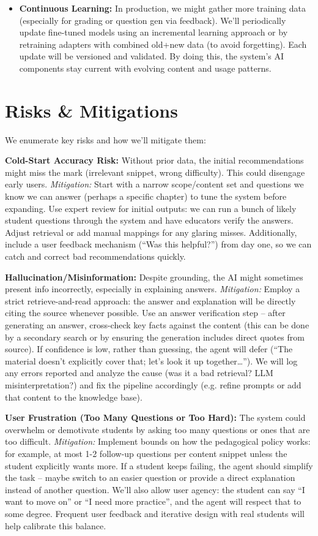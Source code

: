 \documentclass[11pt]{article}
\begin{document}
\begin{itemize}
  \item \textbf{Continuous Learning:} In production, we might gather more training data (especially for grading or question gen via feedback). We’ll periodically update fine-tuned models using an incremental learning approach or by retraining adapters with combined old+new data (to avoid forgetting). Each update will be versioned and validated. By doing this, the system’s AI components stay current with evolving content and usage patterns.
\end{itemize}

\section{Risks \& Mitigations}
We enumerate key risks and how we’ll mitigate them:

\textbf{Cold-Start Accuracy Risk:} Without prior data, the initial recommendations might miss the mark (irrelevant snippet, wrong difficulty). This could disengage early users. \textit{Mitigation:} Start with a narrow scope/content set and questions we know we can answer (perhaps a specific chapter) to tune the system before expanding. Use expert review for initial outputs: we can run a bunch of likely student questions through the system and have educators verify the answers. Adjust retrieval or add manual mappings for any glaring misses. Additionally, include a user feedback mechanism (“Was this helpful?”) from day one, so we can catch and correct bad recommendations quickly.

\textbf{Hallucination/Misinformation:} Despite grounding, the AI might sometimes present info incorrectly, especially in explaining answers. \textit{Mitigation:} Employ a strict retrieve-and-read approach: the answer and explanation will be directly citing the source whenever possible. Use an answer verification step – after generating an answer, cross-check key facts against the content (this can be done by a secondary search or by ensuring the generation includes direct quotes from source). If confidence is low, rather than guessing, the agent will defer (“The material doesn’t explicitly cover that; let’s look it up together…”). We will log any errors reported and analyze the cause (was it a bad retrieval? LLM misinterpretation?) and fix the pipeline accordingly (e.g. refine prompts or add that content to the knowledge base).

\textbf{User Frustration (Too Many Questions or Too Hard):} The system could overwhelm or demotivate students by asking too many questions or ones that are too difficult. \textit{Mitigation:} Implement bounds on how the pedagogical policy works: for example, at most 1-2 follow-up questions per content snippet unless the student explicitly wants more. If a student keeps failing, the agent should simplify the task – maybe switch to an easier question or provide a direct explanation instead of another question. We’ll also allow user agency: the student can say “I want to move on” or “I need more practice”, and the agent will respect that to some degree. Frequent user feedback and iterative design with real students will help calibrate this balance.
\end{document}
